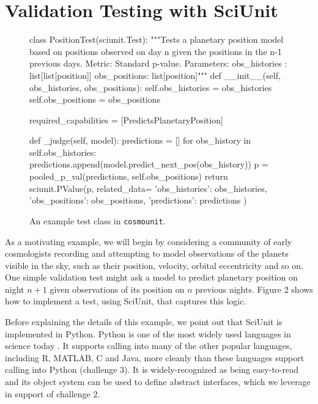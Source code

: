 \documentclass[9pt]{sig-alternate}
\begin{document}
\section{Validation Testing with {SciUnit}}
\begin{figure}[t]
\small
\begin{python}
class PositionTest(sciunit.Test):
    """Tests a planetary position model based on positions observed on day n given the positions in the n-1 previous days.
    Metric: Standard p-value.
    Parameters: 
      obs_histories : list[list[position]]
      obs_positions: list[position]"""
	def __init__(self, obs_histories, obs_positions):
		self.obs_histories = obs_histories
		self.obs_positions = obs_positions

	required_capabilities = [PredictsPlanetaryPosition]

	def _judge(self, model):
		predictions = []
		for obs_history in self.obs_histories:
			predictions.append(model.predict_next_pos(obs_history))
		p = pooled_p_val(predictions, self.obs_positions)
		return sciunit.PValue(p, related_data={
			'obs_histories': obs_histories,
			'obs_positions': obs_positions,
			'predictions': predictions
		})
\end{python}
\vspace{-5px}
\caption{An example test class in \texttt{cosmounit}.}
\label{fig:rate_test}
\vspace{-15px}
\end{figure}

As a motivating example, we will begin by considering a community of early cosmologists recording and attempting to model observations of the planets visible in the sky, such as their position, velocity, orbital eccentricity and so on. One simple validation test might ask a model to predict planetary position on night $n+1$ given observations of its position on $n$ previous nights. Figure 2 shows how to implement a test, using  SciUnit, that captures this logic.

Before explaining the details of this example, we point out that SciUnit is implemented in Python. Python is one of the most widely used languages in science today \cite{sanner1999python}. It supports calling into  many of the other popular languages, including R, MATLAB, C and Java, more cleanly than these languages support calling into Python (challenge 3). It is widely-recognized as being easy-to-read and its object system can be used to define abstract interfaces, which we leverage in support of challenge 2. 
\end{document}
